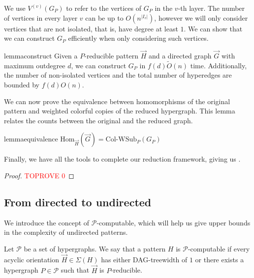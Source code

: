 \documentclass[a4paper,UKenglish,cleveref, autoref, numberwithinsect, thm-restate]{lipics-v2021}
\newcommand{\reducible}[1]{${#1}$-reducible}
\newcommand{\computable}[1]{${#1}$-computable}
\newcommand{\reduced}[1]{G_{#1}}
\newcommand{\maxoutdeg}{d}
\newcommand{\WSub}[2]{\mathrm{\text{Col-WSub}}_{#2}(#1)}
\newcommand{\Hom}[2]{\mathrm{Hom}_{#2}(#1)}
\newcommand{\dagtreewidth}{DAG-treewidth}
\newcommand{\cP}{\mathcal{P}}
\begin{document}
	We use $V^{(v)}(\reduced{P})$ to refer to the vertices of $\reduced{P}$ in the $v$-th layer. 
	The number of vertices in every layer $v$ can be up to $O(n^{|I_v|})$, however we will only consider vertices that are not isolated, that is, have degree at least $1$. We can show that we can construct $\reduced{P}$ efficiently when only considering such vertices.
	
	\begin{restatable}{lemma}{construct} \label{lem:construct_reduced_graph} 
		Given a \reducible{P} pattern $\vec{H}$ and a directed graph $\vec{G}$ with maximum outdegree $\maxoutdeg$, we can construct $\reduced{P}$ in $f(\maxoutdeg)\tilde{O}(n)$ time. Additionally, the number of non-isolated vertices and the total number of hyperedges are bounded by $f(\maxoutdeg)O(n)$.
	\end{restatable}


	We can now prove the equivalence between homomorphisms of the original pattern and weighted colorful copies of the reduced hypergraph. This lemma relates the counts between the original and the reduced graph.

	\begin{restatable}{lemma}{equivalence}\label{lem:equivalence_reduction}
		$
		\Hom{\vec{G}}{\vec{H}} = \WSub{\reduced{P}}{P}
		$
	\end{restatable}


	Finally, we have all the tools to complete our reduction framework, giving us .
	
	\maindirected*
	\begin{proof}\textcolor{red}{TOPROVE 0}\end{proof}

	\subsection{From directed to undirected}
	
	We introduce the concept of \computable{\cP}, which will help us give upper bounds in the complexity of undirected patterns.
	
	\begin{definition}[\computable{\mathcal{P}}] \label{def:computable}
		Let $\mathcal{P}$ be a set of hypergraphs. We say that a pattern $H$ is \computable{\mathcal{P}} if every acyclic orientation $\vec{H} \in \Sigma(H)$ has either \dagtreewidth{} of $1$ or there exists a hypergraph $P \in \mathcal{P}$ such that $\vec{H}$ is $P$-reducible.
	\end{definition}
	
\end{document}
